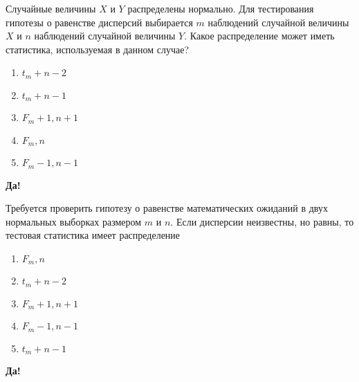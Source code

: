 \documentclass[t]{beamer}
\begin{document}
 \begin{frame} \label{1-Yes} 
\begin{block}{1} 

  Случайные величины $X$ и $Y$ распределены нормально. Для тестирования гипотезы о равенстве дисперсий выбирается $m$ наблюдений случайной величины $X$ и $n$ наблюдений случайной величины $Y$. Какое распределение может иметь статистика, используемая в данном случае?
  


 \end{block} 
\begin{enumerate} 
\item[] \hyperlink{1-No}{\beamergotobutton{} $t_m+n-2$}
\item[] \hyperlink{1-No}{\beamergotobutton{} $t_m+n-1$}
\item[] \hyperlink{1-No}{\beamergotobutton{} $F_m+1,n+1$}
\item[] \hyperlink{1-No}{\beamergotobutton{} $F_m,n$}
\item[] \hyperlink{1-Yes}{\beamergotobutton{} $F_m-1,n-1$}
\end{enumerate} 

 \textbf{Да!} 
 \hyperlink{2}{}\end{frame} 


 \begin{frame} \label{2-Yes} 
\begin{block}{2} 

  Требуется проверить гипотезу о равенстве математических ожиданий в двух нормальных выборках размером $m$ и $n$. Если дисперсии неизвестны, но равны, то тестовая статистика имеет распределение
  


 \end{block} 
\begin{enumerate} 
\item[] \hyperlink{2-No}{\beamergotobutton{} $F_m,n$}
\item[] \hyperlink{2-Yes}{\beamergotobutton{} $t_m+n-2$}
\item[] \hyperlink{2-No}{\beamergotobutton{} $F_m+1,n+1$}
\item[] \hyperlink{2-No}{\beamergotobutton{} $F_m-1,n-1$}
\item[] \hyperlink{2-No}{\beamergotobutton{} $t_m+n-1$}
\end{enumerate} 

 \textbf{Да!} 
 \hyperlink{3}{}\end{frame} 
\end{document}

